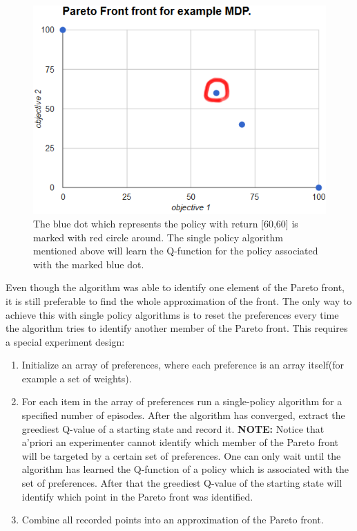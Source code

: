 \begin{figure}[ht]
\centering
\includegraphics[scale=0.6]{exampleMDPOneMarkedPolicy.png}
\caption{The blue dot which represents the policy with return [60,60] is marked with red circle around. The single policy algorithm mentioned above will learn the Q-function for the policy associated with the marked blue dot.}
\label{fig:exampleMDPOneMarkedPolicy}
\end{figure}

Even though the algorithm was able to identify one element of the Pareto front, it is still preferable to find the whole approximation of the front. The only way to achieve this with single policy algorithms is to reset the preferences every time the algorithm tries to identify another member of the Pareto front. This requires a special experiment design:

\begin{enumerate}
  \item Initialize an array of preferences, where each preference is an array itself(for example a set of weights).
  \item For each item in the array of preferences run a single-policy algorithm for a specified number of episodes. After the algorithm has converged, extract the greediest Q-value of a starting state and record it. \textbf{NOTE:} Notice that a'priori an experimenter cannot identify which member of the Pareto front will be targeted by a certain set of preferences. One can only wait until the algorithm has learned the Q-function of a policy which is associated with the set of preferences. After that the greediest Q-value of the starting state will identify which point in the Pareto front was identified.
  \item Combine all recorded points into an approximation of the Pareto front.
\end{enumerate}





